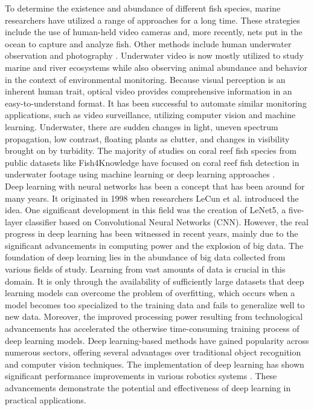 
To determine the existence and abundance of different fish species, marine researchers have utilized a range of approaches for a long time. These strategies include the use of human-held video cameras and, more recently, nets put in the ocean to capture and analyze fish. Other methods include human underwater observation and photography \cite{spampinato2008detecting}. Underwater video is now mostly utilized to study marine and river ecosystems while also observing animal abundance and behavior in the context of environmental monitoring. Because visual perception is an inherent human trait, optical video provides comprehensive information in an easy-to-understand format. It has been successful to automate similar monitoring applications, such as video surveillance, utilizing computer vision and machine learning. Underwater, there are sudden changes in light, uneven spectrum propagation, low contrast, floating plants as clutter, and changes in visibility brought on by turbidity. The majority of studies on coral reef fish species from public datasets like Fish4Knowledge have focused on coral reef fish detection in underwater footage using machine learning or deep learning approaches \cite{xu2018underwater}. \\

Deep learning with neural networks has been a concept that has been around for many years. It originated in 1998 when researchers LeCun et al. \cite{lecun1998gradient} introduced the idea. One significant development in this field was the creation of LeNet5, a five-layer classifier based on Convolutional Neural Networks (CNN). However, the real progress in deep learning has been witnessed in recent years, mainly due to the significant advancements in computing power and the explosion of big data. The foundation of deep learning lies in the abundance of big data collected from various fields of study. Learning from vast amounts of data is crucial in this domain. It is only through the availability of sufficiently large datasets that deep learning models can overcome the problem of overfitting, which occurs when a model becomes too specialized to the training data and fails to generalize well to new data. Moreover, the improved processing power resulting from technological advancements has accelerated the otherwise time-consuming training process of deep learning models.
Deep learning-based methods have gained popularity across numerous sectors, offering several advantages over traditional object recognition and computer vision techniques. The implementation of deep learning has shown significant performance improvements in various robotics systems \cite{cui2020fish}. These advancements demonstrate the potential and effectiveness of deep learning in practical applications. \\

